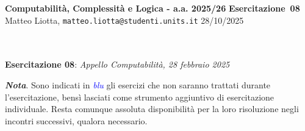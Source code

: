\documentclass[a4paper,10pt]{article}
\makeatletter
\newcommand{\EsercitazioneNum}{08}
\newcommand{\Data}{28/10/2025}
\newcommand{\DocType}{Esercitazione} %
\newcommand{\FullTitle}{\DocType\ \EsercitazioneNum}
\newcommand{\Header}{
\noindent
  \small \textbf{Computabilità, Complessità e Logica - a.a. 2025/26} \hfill \textbf{\FullTitle} \\[0.2cm]
  \scriptsize Matteo Liotta, \texttt{matteo.liotta@studenti.units.it} \hfill \Data \\[0.2cm]
  \noindent\makebox[\linewidth]{\rule{\linewidth}{0.4pt}} \\[0.3cm]}
\makeatother
\begin{document}
\footnotesize  %
\Header\\[0.7cm]



    
    
    \noindent\Large \textbf{Esercitazione 08}: \textit{Appello Computabilità, 28 febbraio 2025}
    \begin{osservazioni}
        \textbf{\textit{Nota}}. Sono indicati in \textcolor{blue}{\textit{blu}} gli esercizi che non saranno trattati durante l'esercitazione, bensì lasciati come strumento aggiuntivo di esercitazione individuale. Resta comunque assoluta disponibilità per la loro risoluzione negli incontri successivi, qualora necessario.
    \end{osservazioni}
    
\end{document}
